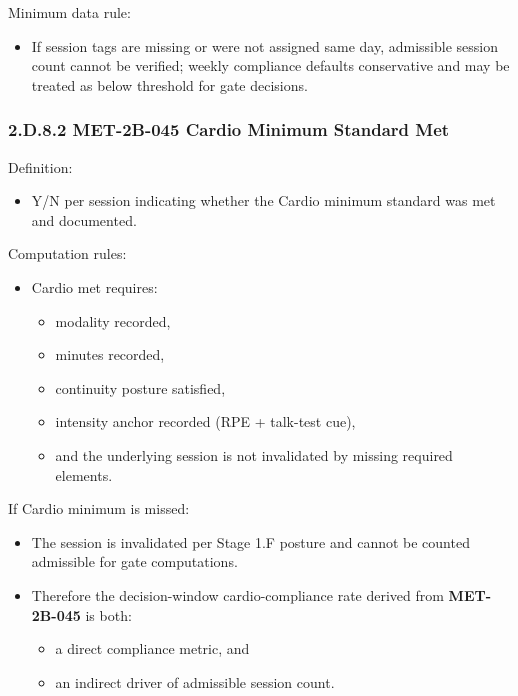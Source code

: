 \documentclass[10pt]{article}
\begin{document}
Minimum data rule:

\begin{itemize}
\item If session tags are missing or were not assigned same day, admissible session count cannot be verified; weekly compliance defaults conservative and may be treated as below threshold for gate decisions.
\end{itemize}

\subsubsection*{2.D.8.2 \textbf{MET-2B-045} Cardio Minimum Standard Met}

Definition:

\begin{itemize}
\item Y/N per session indicating whether the Cardio minimum standard was met and documented.
\end{itemize}

Computation rules:

\begin{itemize}
\item Cardio met requires:
  \begin{itemize}
  \item modality recorded,
  \item minutes recorded,
  \item continuity posture satisfied,
  \item intensity anchor recorded (RPE + talk-test cue),
  \item and the underlying session is not invalidated by missing required elements.
  \end{itemize}
\end{itemize}

If Cardio minimum is missed:

\begin{itemize}
\item The session is invalidated per Stage 1.F posture and cannot be counted admissible for gate computations.
\item Therefore the decision-window cardio-compliance rate derived from \textbf{MET-2B-045} is both:
  \begin{itemize}
  \item a direct compliance metric, and
  \item an indirect driver of admissible session count.
  \end{itemize}
\end{itemize}
\end{document}

